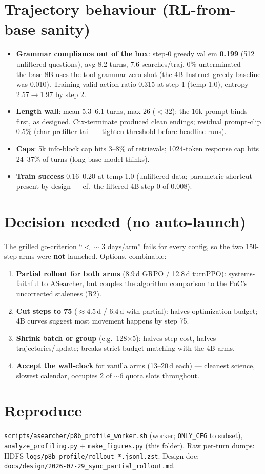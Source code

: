 \documentclass[10pt]{article}
\newcommand{\code}[1]{\texttt{\small #1}}
\begin{document}
\section{Trajectory behaviour (RL-from-base sanity)}
\begin{itemize}
\item \textbf{Grammar compliance out of the box}: step-0 greedy val em \textbf{0.199}
(512 unfiltered questions), avg 8.2 turns, 7.6 searches/traj, 0\% unterminated ---
the base 8B uses the tool grammar zero-shot (the 4B-Instruct greedy baseline was 0.010).
Training valid-action ratio 0.315 at step 1 (temp 1.0), entropy 2.57$\to$1.97 by step 2.
\item \textbf{Length wall}: mean 5.3--6.1 turns, max 26 ($<$32): the 16k prompt binds first,
as designed. Ctx-terminate produced clean endings; residual prompt-clip 0.5\% (char
prefilter tail --- tighten threshold before headline runs).
\item \textbf{Caps}: 5k info-block cap hits 3--8\% of retrievals; 1024-token response cap
hits 24--37\% of turns (long base-model thinks).
\item \textbf{Train success} 0.16--0.20 at temp 1.0 (unfiltered data; parametric shortcut
present by design --- cf.\ the filtered-4B step-0 of 0.008).
\end{itemize}

\section{Decision needed (no auto-launch)}
The grilled go-criterion ``$<\sim$3 days/arm'' fails for every config, so the two 150-step
arms were \textbf{not} launched. Options, combinable:
\begin{enumerate}
\item \textbf{Partial rollout for both arms} (8.9\,d GRPO / 12.8\,d turnPPO): systems-faithful
to ASearcher, but couples the algorithm comparison to the PoC's uncorrected staleness (R2).
\item \textbf{Cut steps to 75} ($\approx$4.5\,d / 6.4\,d with partial): halves optimization
budget; 4B curves suggest most movement happens by step 75.
\item \textbf{Shrink batch or group} (e.g.\ 128$\times$5): halves step cost, halves
trajectories/update; breaks strict budget-matching with the 4B arms.
\item \textbf{Accept the wall-clock} for vanilla arms (13--20\,d each) --- cleanest science,
slowest calendar, occupies 2 of $\sim$6 quota slots throughout.
\end{enumerate}

\section*{Reproduce}
\code{scripts/asearcher/p8b\_profile\_worker.sh} (worker; \code{ONLY\_CFG} to subset),
\code{analyze\_profiling.py} + \code{make\_figures.py} (this folder). Raw per-turn dumps:
HDFS \code{logs/p8b\_profile/rollout\_*.jsonl.zst}. Design doc:
\code{docs/design/2026-07-29\_sync\_partial\_rollout.md}.
\end{document}
